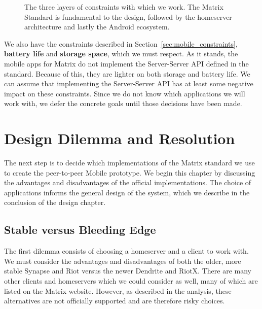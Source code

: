 \begin{figure}
	\centering
	\resizebox{!}{!}{}
	\caption{%
		The three layers of constraints with which we work.
		The Matrix Standard is fundamental to the design, followed by the homeserver architecture and lastly the Android ecosystem.
	}%
	\label{fig:design_constraints}
\end{figure}

We also have the constraints described in Section~\ref{sec:mobile_constraints}, \textbf{battery life} and \textbf{storage space}, which we must respect.
As it stands, the mobile apps for Matrix do not implement the Server-Server \ac{API} defined in the standard.
Because of this, they are lighter on both storage and battery life.
We can assume that implementing the Server-Server \ac{API} has at least some negative impact on these constraints.
Since we do not know which applications we will work with, we defer the concrete goals until those decisions have been made.

\chapter{Design Dilemma and Resolution}\label{chp:design_dilemma}
The next step is to decide which implementations of the Matrix standard we use to create the peer-to-peer Mobile prototype.
We begin this chapter by discussing the advantages and disadvantages of the official implementations.
The choice of applications informs the general design of the system, which we describe in the conclusion of the design chapter.

\section{Stable versus Bleeding Edge}
The first dilemma consists of choosing a homeserver and a client to work with.
We must consider the advantages and disadvantages of both the older, more stable Synapse and Riot versus the newer Dendrite and RiotX.
There are many other clients and homeservers which we could consider as well, many of which are listed on the Matrix website.
However, as described in the analysis, these alternatives are not officially supported and are therefore risky choices.

